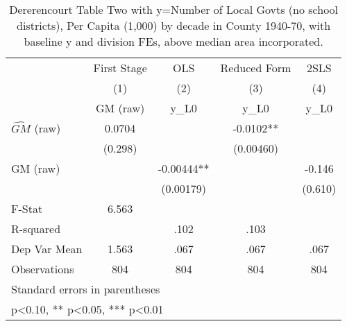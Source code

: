\begin{table}[htbp]\centering
\def\sym#1{\ifmmode^{#1}\else\(^{#1}\)\fi}
\caption{Dererencourt Table Two with y=Number of Local Govts (no school districts), Per Capita (1,000) by decade in County 1940-70, with baseline y and division FEs, above median area incorporated.}
\begin{tabular}{l*{4}{c}}
\toprule
                    & First Stage   &         OLS   &Reduced Form   &        2SLS   \\
                    &\multicolumn{1}{c}{(1)}&\multicolumn{1}{c}{(2)}&\multicolumn{1}{c}{(3)}&\multicolumn{1}{c}{(4)}\\
                    &\multicolumn{1}{c}{GM  (raw)}&\multicolumn{1}{c}{y\_L0}&\multicolumn{1}{c}{y\_L0}&\multicolumn{1}{c}{y\_L0}\\
\midrule
$\hat{GM}$ (raw)    &      0.0704   &               &     -0.0102** &               \\
                    &     (0.298)   &               &   (0.00460)   &               \\
\addlinespace
GM  (raw)           &               &    -0.00444** &               &      -0.146   \\
                    &               &   (0.00179)   &               &     (0.610)   \\
\midrule
F-Stat              &       6.563   &               &               &               \\
R-squared           &               &        .102   &        .103   &               \\
Dep Var Mean        &       1.563   &        .067   &        .067   &        .067   \\
Observations        &         804   &         804   &         804   &         804   \\
\bottomrule
\multicolumn{5}{l}{\footnotesize Standard errors in parentheses}\\
\multicolumn{5}{l}{\footnotesize * p<0.10, ** p<0.05, *** p<0.01}\\
\end{tabular}
\end{table}
